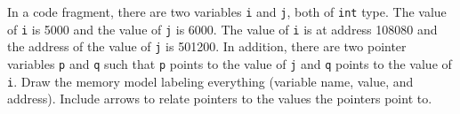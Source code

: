 In a code fragment, there are two variables \texttt{i} and \texttt{j}, both of \texttt{int} type. The value of \texttt{i} is 5000 and the value of \texttt{j} is 6000. The value of \texttt{i} is at address 108080 and the address of the value of \texttt{j} is 501200. In addition, there are two pointer variables \texttt{p} and \texttt{q} such that \texttt{p} points to the value of \texttt{j} and \texttt{q} points to the value of \texttt{i}. Draw the memory model labeling everything (variable name, value, and address). Include arrows to relate pointers to the values the pointers point to.

